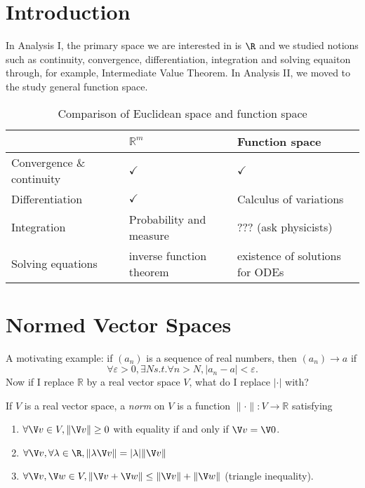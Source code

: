\documentclass[a4paper]{article}
\theoremstyle{definition}
\begin{document}





\tableofcontents

\setcounter{section}{-1}

\section{Introduction}

In Analysis I, the primary space we are interested in is \(\R\) and we studied notions such as continuity, convergence, differentiation, integration and solving equaiton through, for example, Intermediate Value Theorem. In Analysis II, we moved to the study general function space.

\begin{table}[htbp]
  \centering
  \begin{tabular}{|p{}|p{}|p{}|}
    \hline
    & $\mathbb{R}^m$ & Function space \\ \hline
    Convergence \& continuity & $\checkmark$ & $\checkmark$ \\ \hline
    Differentiation & $\checkmark$ & Calculus of variations \\ \hline
    Integration & Probability and measure & ??? (ask physicists) \\ \hline
    Solving equations & inverse function theorem & existence of solutions for ODEs \\ \hline
  \end{tabular}
  \caption{Comparison of Euclidean space and function space}
\end{table}

\section{Normed Vector Spaces}

A motivating example: if $(a_n)$ is a sequence of real numbers, then $(a_n)\to a$ if
\[
  \forall \varepsilon>0,\exists N s.t. \forall n>N, |a_n-a|<\varepsilon.
\]
Now if I replace $\mathbb{R}$ by a real vector space $V$, what do I replace $|\cdot|$ with?

\begin{definition}[Norm]
  If $V$ is a real vector space, a \emph{norm} on $V$ is a function $\|\cdot\|:V\to\mathbb{R}$ satisfying
  \begin{enumerate}
  \item $\forall \V v \in V, \|\V v\| \geq 0$ with equality if and only if $\V v =\V 0$.
  \item $\forall \V v,\forall \lambda \in \R, \|\lambda \V v\| = |\lambda| \|\V v\|$
    \item $\forall \V v,\V w\in V, \|\V v+\V w\| \leq \|\V v\| + \|\V w\|$ (triangle inequality).
  \end{enumerate}
\end{definition}
\end{document}
